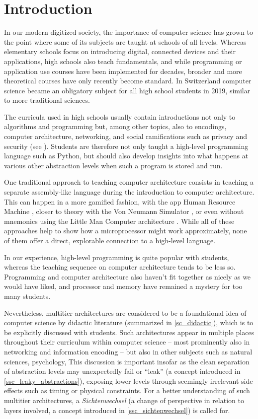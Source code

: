 
\chapter{Introduction}

In our modern digitized society, the importance of computer science has grown to the point where some of its subjects are taught at schools of all levels. Whereas elementary schools focus on introducing digital, connected devices and their applications, high schools also teach fundamentals, and while programming or application use courses have been implemented for decades, broader and more theoretical courses have only recently become standard. In Switzerland \eg computer science became an obligatory subject for all high school students in 2019, similar to more traditional sciences.

The curricula used in high schools usually contain introductions not only to algorithms and programming but, among other topics, also to encodings, computer architecture, networking, and social ramifications such as privacy and security (see \eg \cite{Erz16}). Students are therefore not only taught a high-level programming language such as Python, but should also develop insights into what happens at various other abstraction levels when such a program is stored and run.

One traditional approach to teaching computer architecture consists in teaching a separate assembly-like language during the introduction to computer architecture. This can happen in a more gamified fashion, \eg with the app Human Resource Machine \cite{Tom15}, closer to theory with the Von Neumann Simulator \cite{Gan23}, or even without mnemonics using the Little Man Computer architecture \cite{Oin25}. While all of these approaches help to show how a microprocessor might work approximately, none of them offer a direct, explorable connection to a high-level language.

In our experience, high-level programming is quite popular with students, whereas the teaching sequence on computer architecture tends to be less so. Programming and computer architecture also haven't fit together as nicely as we would have liked, and processor and memory have remained a mystery for too many students.

Nevertheless, multitier architectures are considered to be a foundational idea of computer science by didactic literature (summarized in \ref{sc_didactic}), which is to be explicitly discussed with students. Such architectures appear in multiple places throughout their curriculum within computer science -- most prominently also in networking and information encoding -- but also in other subjects such as natural sciences, psychology, \etc This discussion is important insofar as the clean separation of abstraction levels may unexpectedly fail or ``leak'' (a concept introduced in \ref{ssc_leaky_abstractions}), exposing lower levels through seemingly irrelevant side effects such as timing or physical constraints. For a better understanding of such multitier architectures, a \emph{Sichtenwechsel} (\ie a change of perspective in relation to layers involved, a concept introduced in \ref{ssc_sichtenwechsel}) is called for.

